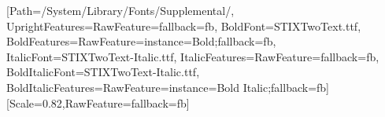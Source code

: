 \setmainfont{STIXTwoText.ttf}[Path=/System/Library/Fonts/Supplemental/,
  UprightFeatures={RawFeature={fallback=fb}},
  BoldFont=STIXTwoText.ttf, BoldFeatures={RawFeature={instance=Bold;fallback=fb}},
  ItalicFont=STIXTwoText-Italic.ttf, ItalicFeatures={RawFeature={fallback=fb}},
  BoldItalicFont=STIXTwoText-Italic.ttf, BoldItalicFeatures={RawFeature={instance=Bold Italic;fallback=fb}}]
\setmonofont{Menlo}[Scale=0.82,RawFeature={fallback=fb}]
\usepackage{etoolbox}
\let\origunderscore\_
\renewcommand{\_}{\origunderscore\allowbreak}
\setlength{\emergencystretch}{3em}
